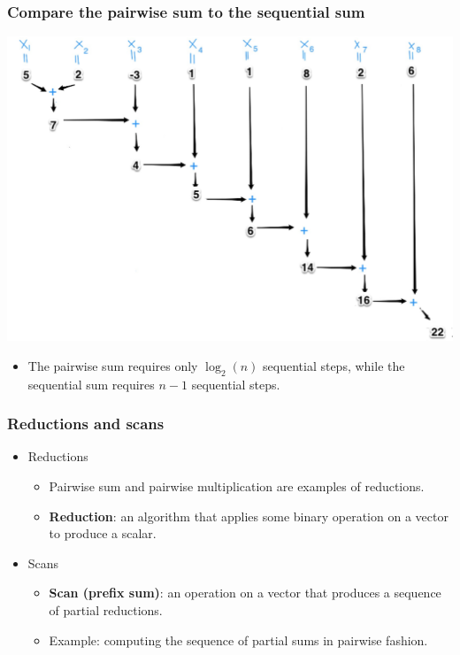 \documentclass[handout]{beamer}
\numberwithin{equation}{section}
\begin{document}
\begin{frame}
\frametitle{Compare the pairwise sum to the sequential sum}
\includegraphics[scale=.25]{../../fig/sequential}
\begin{itemize}
\item The pairwise sum requires only $\log_2(n)$ sequential steps, while the sequential sum requires $n-1$ sequential steps.
\end{itemize}
\end{frame}


\begin{frame}
\frametitle{Reductions and scans}

\begin{itemize}
\item Reductions
\begin{itemize}
\pause \item Pairwise sum and pairwise multiplication are examples of reductions.
\pause \item {\bf Reduction}: an algorithm that applies some binary operation on a vector to produce a scalar.
\end{itemize}
\pause \item Scans
\begin{itemize}
\pause \item {\bf Scan (prefix sum)}: an operation on a vector that produces a sequence of partial reductions.
\pause \item Example: computing the sequence of partial sums in pairwise fashion.
\end{itemize}
\end{itemize}
\end{frame}
\end{document}

